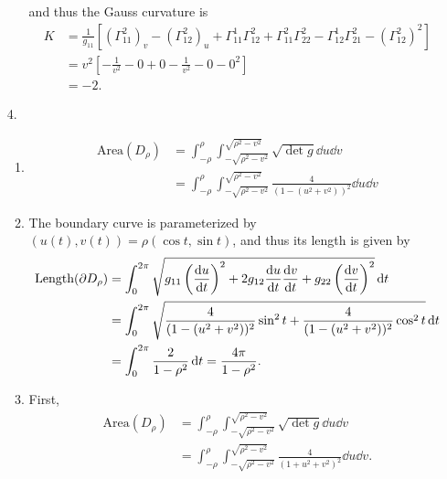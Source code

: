 \documentclass[a4paper,12pt]{article}
\theoremstyle{remark}
\begin{document}
\begin{enumerate}
\begin{enumerate}
                and thus the Gauss curvature is
                \begin{align*}
                    K &= \frac{1}{g_{11}} \left[ (\Gamma_{11}^2)_v - (\Gamma_{12}^2)_u + \Gamma_{11}^1 \Gamma_{12}^2 + \Gamma_{11}^2 \Gamma_{22}^2 - \Gamma_{12}^1 \Gamma_{21}^2 - (\Gamma_{12}^2)^2 \right] \\
                    &= v^2 \left[ -\frac{1}{v^2} - 0 + 0 - \frac{1}{v^2} - 0 - 0^2 \right] \\
                    &= -2.
                \end{align*}
        \end{enumerate}

    \item[4.]
        \begin{enumerate}
            \item
                \begin{align*}
                    \text{Area}(D_\rho) &= \int_{-\rho}^\rho \int_{-\sqrt{\rho^2 - v^2}}^{\sqrt{\rho^2 - v^2}} \sqrt{\det g} \dd{u} \dd{v} \\
                    &= \int_{-\rho}^\rho \int_{-\sqrt{\rho^2 - v^2}}^{\sqrt{\rho^2 - v^2}} \frac{4}{(1 - (u^2 + v^2))^2} \dd{u} \dd{v}
                \end{align*}
            \item
                The boundary curve is parameterized by $(u(t), v(t)) = \rho(\cos t, \sin t)$, and thus its length is given by
                \begin{align*}
                    \text{Length}(\partial D_\rho) &= \int_0^{2\pi} \sqrt{ g_{11} \left( \dv{u}{t} \right)^2 + 2g_{12} \dv{u}{t} \dv{v}{t} + g_{22} \left( \dv{v}{t} \right)^2 } \dd{t} \\
                    &= \int_0^{2\pi} \sqrt{ \frac{4}{(1 - (u^2 + v^2))^2}\sin^2 t + \frac{4}{(1 - (u^2 + v^2))^2}\cos^2 t } \dd{t} \\
                    &= \int_0^{2\pi} \frac{2}{1 - \rho^2} \dd{t} = \frac{4\pi}{1 - \rho^2}.
                \end{align*}
            \item
                First,
                \begin{align*}
                    \text{Area}(D_\rho) &= \int_{-\rho}^\rho \int_{-\sqrt{\rho^2 - v^2}}^{\sqrt{\rho^2 - v^2}} \sqrt{\det g} \dd{u} \dd{v} \\
                    &= \int_{-\rho}^\rho \int_{-\sqrt{\rho^2 - v^2}}^{\sqrt{\rho^2 - v^2}} \frac{4}{(1 + u^2 + v^2)^2} \dd{u} \dd{v}.

\end{align*}
\end{enumerate}
\end{enumerate}
\end{document}
